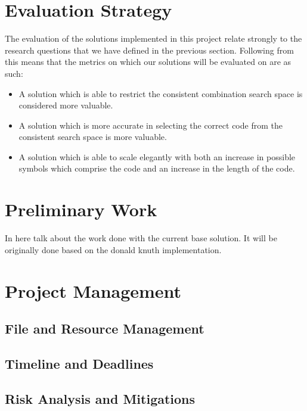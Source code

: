 \documentclass[12pt]{article}  %
\theoremstyle{definition}
\theoremstyle{remark}
\begin{document}
\newpage                     %
\section{Evaluation Strategy}\label{ss:back}

The evaluation of the solutions implemented in this project relate strongly to the research questions that we have defined in the previous section. Following from this means that the metrics on which our solutions will be evaluated on are as such:
\begin {itemize}
	\item {A solution which is able to restrict the consistent combination search space is considered more valuable.}
	\item {A solution which is more accurate in selecting the correct code from the consistent search space is more valuable.}
	\item {A solution which is able to scale elegantly with both an increase in possible symbols which comprise the code and an increase in the length of the code.}
\end{itemize}

\newpage
\section {Preliminary Work}

In here talk about the work done with the current base solution. It will be originally done based on the donald knuth implementation.


\newpage                     %
\section{Project Management}\label{ss:back}

\subsection {File and Resource Management}

\subsection {Timeline and Deadlines}

\subsection {Risk Analysis and Mitigations}
\end{document}
